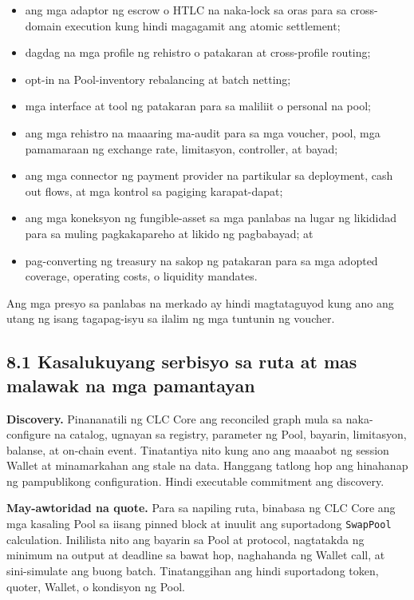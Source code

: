 \documentclass[11pt]{article}
\begin{document}
\begin{itemize}[leftmargin=*]
\item ang mga adaptor ng escrow o HTLC na naka-lock sa oras para sa cross-domain execution kung hindi magagamit ang atomic settlement;
\item dagdag na mga profile ng rehistro o patakaran at cross-profile routing;
\item opt-in na Pool-inventory rebalancing at batch netting;
\item mga interface at tool ng patakaran para sa maliliit o personal na pool;
\item ang mga rehistro na maaaring ma-audit para sa mga voucher, pool, mga pamamaraan ng exchange rate, limitasyon, controller, at bayad;
\item ang mga connector ng payment provider na partikular sa deployment, cash out flows, at mga kontrol sa pagiging karapat-dapat;
\item ang mga koneksyon ng fungible-asset sa mga panlabas na lugar ng likididad para sa muling pagkakapareho at likido ng pagbabayad; at
\item pag-converting ng treasury na sakop ng patakaran para sa mga adopted coverage, operating costs, o liquidity mandates.
\end{itemize}
Ang mga presyo sa panlabas na merkado ay hindi magtataguyod kung ano ang utang ng isang tagapag-isyu sa ilalim ng mga tuntunin ng voucher.

\subsection*{8.1 Kasalukuyang serbisyo sa ruta at mas malawak na mga pamantayan}

\textbf{Discovery.} Pinananatili ng CLC Core ang reconciled graph mula sa naka-configure na catalog, ugnayan sa registry, parameter ng Pool, bayarin, limitasyon, balanse, at on-chain event. Tinatantiya nito kung ano ang maaabot ng session Wallet at minamarkahan ang stale na data. Hanggang tatlong hop ang hinahanap ng pampublikong configuration. Hindi executable commitment ang discovery.

\textbf{May-awtoridad na quote.} Para sa napiling ruta, binabasa ng CLC Core ang mga kasaling Pool sa iisang pinned block at inuulit ang suportadong \texttt{SwapPool} calculation. Inililista nito ang bayarin sa Pool at protocol, nagtatakda ng minimum na output at deadline sa bawat hop, naghahanda ng Wallet call, at sini-simulate ang buong batch. Tinatanggihan ang hindi suportadong token, quoter, Wallet, o kondisyon ng Pool.
\end{document}

